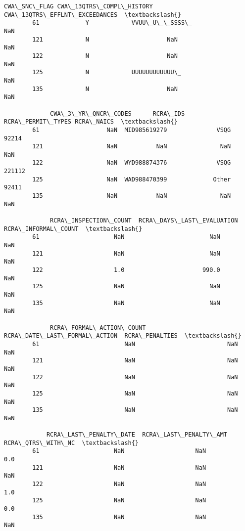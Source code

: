 \documentclass[11pt]{article}
\begin{document}
\begin{Verbatim}[commandchars=\\\{\}]
            CWA\_SNC\_FLAG CWA\_13QTRS\_COMPL\_HISTORY  CWA\_13QTRS\_EFFLNT\_EXCEEDANCES  \textbackslash{}
        61             Y            VVUU\_U\_\_SSSS\_                            NaN   
        121            N                      NaN                            NaN   
        122            N                      NaN                            NaN   
        125            N            UUUUUUUUUUUU\_                            NaN   
        135            N                      NaN                            NaN   
        
             CWA\_3\_YR\_QNCR\_CODES      RCRA\_IDS RCRA\_PERMIT\_TYPES RCRA\_NAICS  \textbackslash{}
        61                   NaN  MID985619279              VSQG      92214   
        121                  NaN           NaN               NaN        NaN   
        122                  NaN  WYD988874376              VSQG     221112   
        125                  NaN  WAD988470399             Other      92411   
        135                  NaN           NaN               NaN        NaN   
        
             RCRA\_INSPECTION\_COUNT  RCRA\_DAYS\_LAST\_EVALUATION  RCRA\_INFORMAL\_COUNT  \textbackslash{}
        61                     NaN                        NaN                  NaN   
        121                    NaN                        NaN                  NaN   
        122                    1.0                      990.0                  NaN   
        125                    NaN                        NaN                  NaN   
        135                    NaN                        NaN                  NaN   
        
             RCRA\_FORMAL\_ACTION\_COUNT RCRA\_DATE\_LAST\_FORMAL\_ACTION  RCRA\_PENALTIES  \textbackslash{}
        61                        NaN                          NaN             NaN   
        121                       NaN                          NaN             NaN   
        122                       NaN                          NaN             NaN   
        125                       NaN                          NaN             NaN   
        135                       NaN                          NaN             NaN   
        
            RCRA\_LAST\_PENALTY\_DATE  RCRA\_LAST\_PENALTY\_AMT  RCRA\_QTRS\_WITH\_NC  \textbackslash{}
        61                     NaN                    NaN                0.0   
        121                    NaN                    NaN                NaN   
        122                    NaN                    NaN                1.0   
        125                    NaN                    NaN                0.0   
        135                    NaN                    NaN                NaN   
        

\end{Verbatim}
\end{document}
